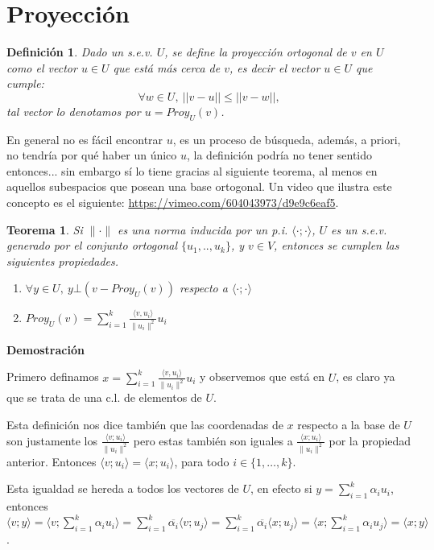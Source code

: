 \documentclass[12pt]{book}
\newtheorem{teo}{Teorema}
\newtheorem{defi}{Definici\'on}
\begin{document}
{\section{Proyección}


    
\begin{defi}
Dado un s.e.v. $U$, se define la \emph{proyección ortogonal} de $v$ en $U$ como el vector $u\in U$ que está más cerca de $v$, es decir el vector $u\in U$ que cumple:
$$\forall w\in U,\ ||v-u||\le ||v-w||,$$
tal vector lo denotamos por $u=Proy_U(v)$.
\end{defi}

En general no es fácil encontrar $u$, es un proceso de búsqueda, además, a priori, no tendría por qué haber un único $u$, la definición podría no tener sentido entonces... sin embargo sí lo tiene gracias al siguiente teorema, al menos en aquellos subespacios que posean una base ortogonal.
Un video que ilustra este concepto es el siguiente: \url{https://vimeo.com/604043973/d9e9c6eaf5}.

\begin{teo}
Si $\|\cdot\|$ es una norma inducida por un p.i. $\langle\cdot;\cdot\rangle$, $U$ es un s.e.v. generado por el conjunto ortogonal $\{u_1,.., u_k\}$, y $v\in V$, entonces se cumplen las siguientes propiedades.
\begin{enumerate}
\item $\forall y\in U,\ y\bot \left(v-Proy_U(v)\right)$ respecto a $\langle\cdot;\cdot\rangle$
\item $Proy_U(v)=\displaystyle{\sum_{i=1}^k \frac{\langle v,u_i\rangle}{\|u_i\|^2}u_i}$
\end{enumerate}
\end{teo}
    {\bf Demostración} {\small
      Primero definamos $x=\sum_{i=1}^k \frac{\langle v,u_i\rangle}{\|u_i\|^2}u_i$ y observemos que está en $U$, es claro ya que se trata de una c.l. de elementos de $U$.

      Esta definición nos dice también que las coordenadas de $x$ respecto a la base de $U$ son justamente los $\frac{\langle v;u_i\rangle}{\|u_i\|^2}$ pero estas también son iguales a  $\frac{\langle x;u_i\rangle}{\|u_i\|^2}$ por la propiedad anterior. Entonces $\langle v;u_i\rangle=\langle x;u_i\rangle$, para todo $i\in\{1,\dots ,k\}$.

      Esta igualdad se hereda a todos los vectores de $U$, en efecto si $y=\sum_{i=1}^k\alpha_i u_i$, entonces\\
      $\langle v;y\rangle
      =\langle v; \sum_{i=1}^k \alpha_i u_i\rangle
      =\sum_{i=1}^k\overline{\alpha_i} \langle v;u_j\rangle
      =\sum_{i=1}^k\overline{\alpha_i} \langle x;u_j\rangle
      =\langle x;\sum_{i=1}^k\alpha_i u_j\rangle
      =\langle x; y\rangle$.
      
}}
\end{document}
